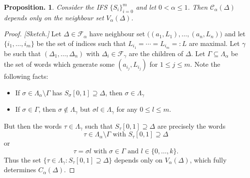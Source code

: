 \documentclass[11pt, a4paper]{memoir}
\theoremstyle{change}
\newtheorem{proposition}[theorem]{Proposition.}
\theoremstyle{plain}
\theoremstyle{nonumberplain}
\newtheorem{proof}{Proof}
\numberwithin{equation}{section}
\begin{document}
\begin{proposition}\label{p:ttype}
    Consider the IFS $\{S_i\}_{i=0}^m$ and let $0<\alpha\leq 1$.
    Then $\mathcal{C}_\alpha(\Delta)$ depends only on the neighbour set $V_\alpha(\Delta)$.
\end{proposition}
\begin{proof}
    \textit{[Sketch.]}
    Let $\Delta\in \mathcal{F}_\alpha$ have neighbour set $\bigl((a_1,L_1),\ldots,(a_n,L_n)\bigr)$ and let $\{i_1,\ldots,i_m\}$ be the set of indices such that $L_{i_1}=\cdots=L_{i_m}=:L$ are maximal.
    Let $\gamma$ be such that $(\Delta_1,\ldots,\Delta_n)$ with $\Delta_i\in\mathcal{F}_\gamma$ are the children of $\Delta$.
    Let $\Gamma\subseteq\Lambda_\alpha$ be the set of words which generate some $(a_{i_j},L_{i_j})$ for $1\leq j\leq m$.
    Note the following facts:
    \begin{itemize}[nl]
        \item If $\sigma\in\Lambda_\alpha\setminus\Gamma$ has $S_\sigma[0,1]\supseteq\Delta$, then $\sigma\in\Lambda_\gamma$
        \item If $\sigma\in\Gamma$, then $\sigma\notin\Lambda_\gamma$ but $\sigma l\in\Lambda_\gamma$ for any $0\leq l\leq m$.
    \end{itemize}
    But then the words $\tau\in\Lambda_\gamma$ such that $S_\tau[0,1]\supseteq\Delta$ are precisely the words
    \begin{equation*}
        \tau \in\Lambda_\alpha\setminus\Gamma\text{ with } S_\tau[0,1]\supseteq\Delta
    \end{equation*}
    or
    \begin{equation*}
        \tau=\sigma l\text{ with }\sigma\in\Gamma\text{ and }l\in\{0,\ldots,k\}.
    \end{equation*}
    Thus the set $\{\tau\in\Lambda_\gamma:S_\tau[0,1]\supseteq\Delta\}$ depends only on $V_\alpha(\Delta)$, which fully determines $C_\alpha(\Delta)$.
\end{proof}
\end{document}
